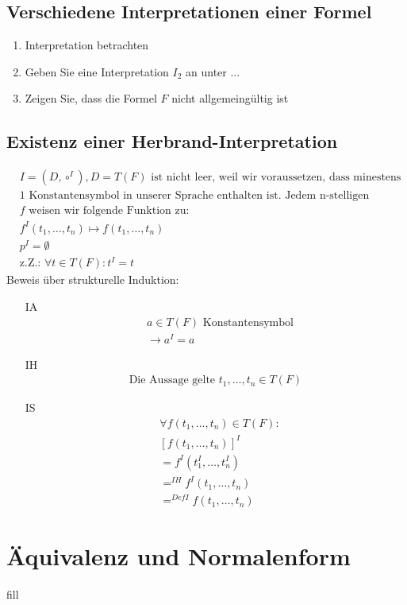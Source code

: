 \subsection{Verschiedene Interpretationen einer Formel}
\begin{enumerate}
	\item Interpretation betrachten
	\item Geben Sie eine Interpretation \(I_2\) an unter ...
	\item Zeigen Sie, dass die Formel \(F\) nicht allgemeingültig ist
\end{enumerate}
\subsection{Existenz einer Herbrand-Interpretation}
\begin{align*}
	&I = (D, \circ^I), D = T(F) \text{ ist nicht leer, weil wir voraussetzen, dass minestens }\\ &\text{1 Konstantensymbol in unserer Sprache enthalten ist. Jedem n-stelligen Funktionssymbol}\\ &f \text{ weisen wir folgende Funktion zu:}\\
	&f^I(t_1, \ldots, t_n) \mapsto f(t_1, \ldots, t_n) \\
	&p^I = \emptyset \\
	&\text{z.Z.: }\forall t \in T(F): t^I = t
\end{align*}
Beweis über strukturelle Induktion:
\begin{itemize}
	\item[IA]
	\begin{align*}
		&a \in T(F) \text{ Konstantensymbol} \\
		&\to a^I = a
	\end{align*}
	\item[IH]
	\begin{align*}
		\text{Die Aussage gelte } t_1,\ldots, t_n \in T(F)
	\end{align*}
	\item[IS]
	\begin{align*}
		&\forall f(t_1, \ldots, t_n) \in T(F): \\
		&[f(t_1, \ldots,t_n)]^I \\
		&= f^I(t_1^I,\ldots, t_n^I) \\
		&=^{IH} f^I(t_1, \ldots, t_n) \\
		&=^{Def I} f(t_1,\ldots , t_n)
	\end{align*}
\end{itemize}
\section{Äquivalenz und Normalenform}
fill
